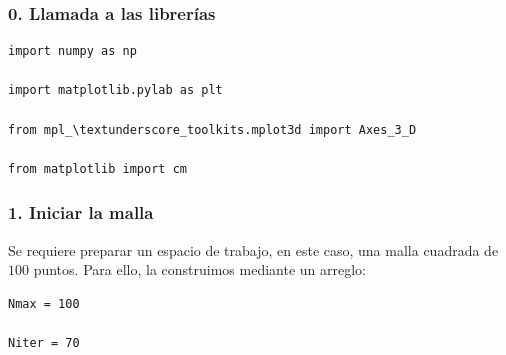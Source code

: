 {
\begin{frame}[fragile]
\frametitle{0. Llamada a las librerías}
\begin{lstlisting}[caption=Llamando a las librerías que se utilizarán, style=FormattedNumber, basicstyle=\linespread{1.1}\ttfamily=\small, columns=fullflexible]
import numpy as np

import matplotlib.pylab as plt

from mpl_\textunderscore_toolkits.mplot3d import Axes_3_D

from matplotlib import cm
\end{lstlisting}
\end{frame}
\begin{frame}[fragile]
\frametitle{1. Iniciar la malla}
Se requiere preparar un espacio de trabajo, en este caso, una malla cuadrada de $100$ puntos. Para ello, la construimos mediante un arreglo:
\\
\bigskip
\begin{lstlisting}[caption=Construyendo la malla, style=FormattedNumber, basicstyle=\linespread{1.1}\ttfamily=\small, columns=fullflexible]
Nmax = 100

Niter = 70


\end{lstlisting}
\end{frame}}
